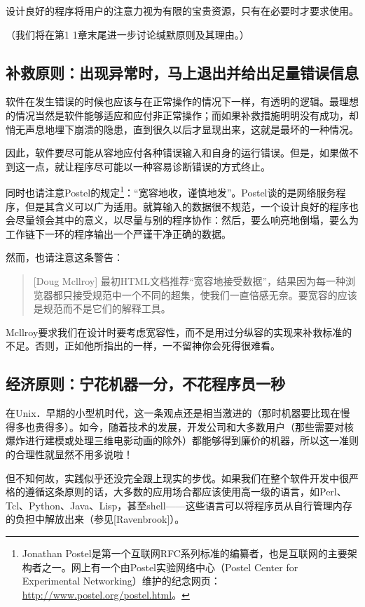 \documentclass[12pt,oneside]{book}
\begin{document}
\begin{common-format}
设计良好的程序将用户的注意力视为有限的宝贵资源，只有在必要时才要求使用。

（我们将在第1 1章末尾进一步讨论缄默原则及其理由。）


\subsection{补救原则：出现异常时，马上退出并给出足量错误信息}
软件在发生错误的时候也应该与在正常操作的情况下一样，有透明的逻辑。最理想的情况当然是软件能够适应和应付非正常操作；而如果补救措施明明没有成功，却悄无声息地埋下崩溃的隐患，直到很久以后才显现出来，这就是最坏的一种情况。

因此，软件要尽可能从容地应付各种错误输入和自身的运行错误。但是，如果做不到这一点，就让程序尽可能以一种容易诊断错误的方式终止。

同时也请注意Postel的规定\footnote{Jonathan Postel是第一个互联网RFC系列标准的编纂者，也是互联网的主要架构者之一。网上有一个由Postel实验网络中心（Postel Center for Experimental Networking）维护的纪念网页：\href{http://www.postel.org/postel.html}{http://www.postel.org/postel.html}。}：“宽容地收，谨慎地发”。Postel谈的是网络服务程序，但是其含义可以广为适用。就算输入的数据很不规范，一个设计良好的程序也会尽量领会其中的意义，以尽量与别的程序协作：然后，要么响亮地倒塌，要么为工作链下一环的程序输出一个严谨干净正确的数据。

然而，也请注意这条警告：

\begin{quote}[Doug Mcllroy]
最初HTML文档推荐“宽容地接受数据”，结果因为每一种浏览器都只接受规范中一个不同的超集，使我们一直倍感无奈。要宽容的应该是规范而不是它们的解释工具。
\end{quote}

Mcllroy要求我们在设计时要考虑宽容性，而不是用过分纵容的实现来补救标准的不足。否则，正如他所指出的一样，一不留神你会死得很难看。

\subsection{经济原则：宁花机器一分，不花程序员一秒}
在Unix．早期的小型机时代，这一条观点还是相当激进的（那时机器要比现在慢得多也贵得多）。如今，随着技术的发展，开发公司和大多数用户（那些需要对核爆炸进行建模或处理三维电影动画的除外）都能够得到廉价的机器，所以这一准则的合理性就显然不用多说啦！

但不知何故，实践似乎还没完全跟上现实的步伐。如果我们在整个软件开发中很严格的遵循这条原则的话，大多数的应用场合都应该使用高一级的语言，如Perl、Tcl、Python、Java、Lisp，甚至shell——这些语言可以将程序员从自行管理内存的负担中解放出来（参见[Ravenbrook]）。


\end{common-format}
\end{document}
